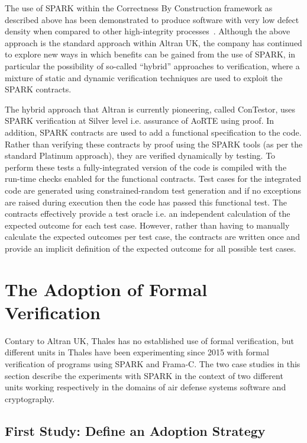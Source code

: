 \documentclass{llncs}
\begin{document}
The use of SPARK within the Correctness By Construction framework as described
above has been demonstrated to produce software with very low defect density
when compared to other high-integrity
processes~\cite{Croxford2005Manifesto}. Although the above approach is the
standard approach within Altran UK, the company has continued to explore new ways in
which benefits can be gained from the use of SPARK, in particular the
possibility of so-called ``hybrid'' approaches to verification, where a mixture
of static and dynamic verification techniques are used to exploit the SPARK
contracts.

The hybrid approach that Altran is currently pioneering, called ConTestor, uses
SPARK verification at Silver level i.e. assurance of AoRTE using proof. In
addition, SPARK contracts are used to add a functional specification to the
code. Rather than verifying these contracts by proof using the SPARK tools (as
per the standard Platinum approach), they are verified dynamically by
testing. To perform these tests a fully-integrated version of the code is
compiled with the run-time checks enabled for the functional contracts. Test
cases for the integrated code are generated using constrained-random test
generation and if no exceptions are raised during execution then the code has
passed this functional test. The contracts effectively provide a test oracle
i.e. an independent calculation of the expected outcome for each test
case. However, rather than having to manually calculate the expected outcomes
per test case, the contracts are written once and provide an implicit
definition of the expected outcome for all possible test cases.

\section{The Adoption of Formal Verification}
\label{sec:adoption}

Contary to Altran UK, Thales has no established use of formal verification, but
different units in Thales have been experimenting since 2015 with formal
verification of programs using SPARK and Frama-C. The two case studies in this
section describe the experiments with SPARK in the context of two different
units working respectively in the domains of air defense systems software and cryptography.

\subsection{First Study: Define an Adoption Strategy}
\end{document}
